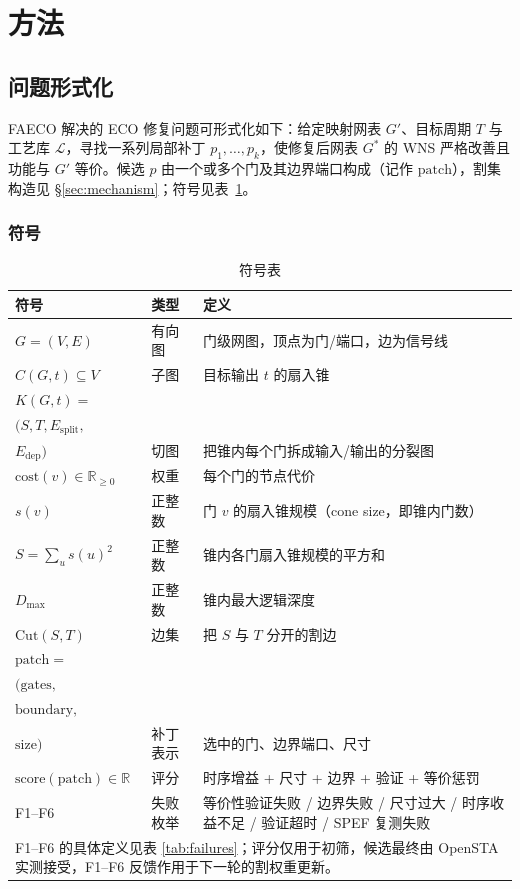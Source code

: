 \documentclass[journal]{IEEEtran}
\begin{document}
\section{方法}

\subsection{问题形式化}
FAECO 解决的 ECO 修复问题可形式化如下：给定映射网表 $G'$、目标周期 $T$ 与工艺库 $\mathcal{L}$，寻找一系列局部补丁 $p_1,\dots,p_k$，使修复后网表 $G^*$ 的 WNS 严格改善且功能与 $G'$ 等价。候选 $p$ 由一个或多个门及其边界端口构成（记作 $\mathrm{patch}$），割集构造见 \S\ref{sec:mechanism}；符号见表~\ref{tab:symbols}。

\subsubsection{符号}
\begin{table}[!t]
\centering
\caption{符号表}
\label{tab:symbols}
\scriptsize
\setlength{\tabcolsep}{2pt}
\begin{tabular}{p{3.4cm}p{1.5cm}p{3.4cm}}
\toprule
\textbf{符号} & \textbf{类型} & \textbf{定义} \\
\midrule
$G = (V, E)$ & 有向图 & 门级网图，顶点为门/端口，边为信号线 \\
$C(G, t) \subseteq V$ & 子图 & 目标输出 $t$ 的扇入锥 \\
$K(G, t) =$ \\
$(S, T, E_{\mathrm{split}},$ \\
$E_{\mathrm{dep}})$ & 切图 & 把锥内每个门拆成输入/输出的分裂图 \\
$\mathrm{cost}(v) \in \mathbb{R}_{\geq 0}$ & 权重 & 每个门的节点代价 \\
$s(v)$ & 正整数 & 门 $v$ 的扇入锥规模（cone size，即锥内门数）\\
$S = \sum_u s(u)^2$ & 正整数 & 锥内各门扇入锥规模的平方和 \\

$D_{\max}$ & 正整数 & 锥内最大逻辑深度 \\
$\mathrm{Cut}(S, T)$ & 边集 & 把 $S$ 与 $T$ 分开的割边 \\
$\mathrm{patch} =$ \\
$(\mathrm{gates},$ \\
$\mathrm{boundary},$ \\
$\mathrm{size})$ & 补丁表示 & 选中的门、边界端口、尺寸 \\
$\mathrm{score}(\mathrm{patch}) \in \mathbb{R}$ & 评分 & 时序增益 + 尺寸 + 边界 + 验证 + 等价惩罚 \\
F1--F6 & 失败枚举 & 等价性验证失败 / 边界失败 / 尺寸过大 / 时序收益不足 / 验证超时 / SPEF 复测失败 \\
\bottomrule
\multicolumn{3}{p{8.0cm}}{\footnotesize F1--F6 的具体定义见表 \ref{tab:failures}；评分仅用于初筛，候选最终由 OpenSTA 实测接受，F1--F6 反馈作用于下一轮的割权重更新。}\\
\end{tabular}
\end{table}
\end{document}
